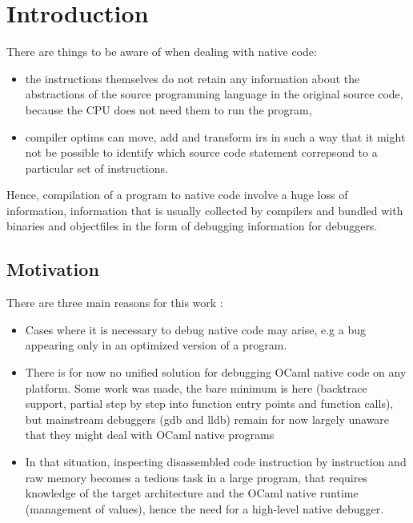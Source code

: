 \chapter{Introduction\label{cha:chapter1}}

There are things to be aware of when dealing with \gls{native} code:
\begin{itemize}
    \item the instructions themselves do not retain any information about the abstractions of the source programming language in the original source code, because the CPU does not need them to run the program,

\item compiler \glspl{optim} can move, add and transform \glspl{ir} in such a way that it might not be possible to identify which source code statement correpsond to a particular set of instructions.
\end{itemize}

Hence, compilation of a program to native code involve a huge loss of information, information that is usually collected by compilers and bundled with binaries and \glspl{objectfile} in the form of debugging information for debuggers.

\section{Motivation\label{sec:moti}}

There are three main reasons for this work :

\begin{itemize}
    \item Cases where it is necessary to debug native code may arise, e.g a bug appearing only in an optimized version of a program.
    \item There is for now no unified solution for debugging OCaml native code on any platform. Some work was made, the bare minimum is here (\gls{backtrace} support, partial step by step into function entry points and function calls), but mainstream debuggers (gdb and lldb) remain for now largely unaware that they might deal with OCaml native programs
    \item In that situation, inspecting disassembled code instruction by instruction and raw memory becomes a tedious task in a large program, that requires knowledge of the target architecture and the OCaml native runtime (management of values), hence the need for a high-level native debugger.
\end{itemize}

